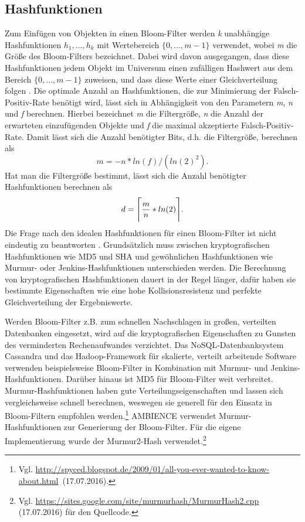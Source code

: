 \subsection{Hashfunktionen}\label{sec:hashfunktionen}
Zum Einfügen von Objekten in einen Bloom-Filter werden \textit{k} unabhängige Hashfunktionen $h_1,\ldots , h_k$ mit Wertebereich $\{ 0,\ldots, m-1\}$ verwendet, wobei \textit{m} die Größe des Bloom-Filters bezeichnet. Dabei wird davon ausgegangen, dass diese Hashfunktionen jedem Objekt im Universum einen zufälligen Hashwert aus dem Bereich $\{ 0,\ldots, m-1\}$ zuweisen, und dass diese Werte einer Gleichverteilung folgen \cite{Mitzenmacher2002}. Die optimale Anzahl an Hashfunktionen, die zur Minimierung der Falsch-Positiv-Rate benötigt wird, lässt sich in Abhängigkeit von den Parametern \textit{m}, \textit{n} und \textit{f} berechnen. Hierbei bezeichnet \textit{m} die Filtergröße, \textit{n} die Anzahl der erwarteten einzufügenden Objekte und \textit{f} die maximal akzeptierte Falsch-Positiv-Rate. Damit lässt sich die Anzahl benötigter Bits, d.h. die Filtergröße, berechnen als
\[m = -n\ast ln(f) / (ln(2)^2).\]
Hat man die Filtergröße bestimmt, lässt sich die Anzahl benötigter Hashfunktionen berechnen als 
\[d = \Ceil[\Bigg]{\frac{m}{n}\ast ln(2)}.\]
Die Frage nach den idealen Hashfunktionen für einen Bloom-Filter ist nicht eindeutig zu beantworten \cite{Broder2004}. Grundsätzlich muss zwischen kryptografischen Hashfunktionen wie MD5 und SHA und gewöhnlichen Hashfunktionen wie Murmur- oder Jenkins-Hashfunktionen unterschieden werden. Die Berechnung von kryptografischen Hashfunktionen dauert in der Regel länger, dafür haben sie bestimmte Eigenschaften wie eine hohe Kollisionsresistenz und perfekte Gleichverteilung der Ergebniswerte. 

Werden Bloom-Filter z.B. zum schnellen Nachschlagen in großen, verteilten Datenbanken eingesetzt, wird auf die kryptografischen Eigenschaften zu Gunsten des verminderten Rechenaufwandes verzichtet. Das NoSQL-Datenbanksystem Cassandra und das Hadoop-Framework für skalierte, verteilt arbeitende Software verwenden beispielsweise Bloom-Filter in Kombination mit Murmur- und Jenkins-Hashfunktionen. Darüber hinaus ist MD5 für Bloom-Filter weit verbreitet. Murmur-Hashfunktionen haben gute Verteilungseigenschaften und lassen sich vergleichsweise schnell berechnen, weswegen sie generell für den Einsatz in Bloom-Filtern empfohlen werden.\footnote{Vgl. \mbox{\url{http://spyced.blogspot.de/2009/01/all-you-ever-wanted-to-know-about.html} (17.07.2016).}} AMBIENCE verwendet Murmur-Hashfunktionen zur Generierung der Bloom-Filter. Für die eigene Implementierung wurde der Murmur2-Hash verwendet.\footnote{Vgl. \url{https://sites.google.com/site/murmurhash/MurmurHash2.cpp} (17.07.2016) für den Quellcode.}
